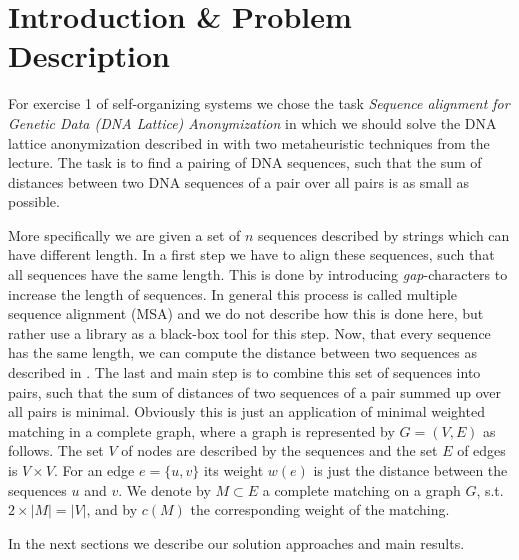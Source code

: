 \documentclass[12pt]{article}
\begin{document}
\maketitle

\section{Introduction \& Problem Description}
For exercise 1 of self-organizing systems we chose the task \textit{Sequence alignment for Genetic Data (DNA Lattice) Anonymization} in which we should solve the DNA lattice anonymization described in \cite{mainpaper} with two metaheuristic techniques from the lecture.
The task is to find a pairing of DNA sequences, such that the sum of distances between two DNA sequences of a pair over all pairs is as small as possible.

More specifically we are given a set of $n$ sequences described by strings which can have different length.
In a first step we have to align these sequences, such that all sequences have the same length.
This is done by introducing \textit{gap}-characters to increase the length of sequences.
In general this process is called multiple sequence alignment (MSA) and we do not describe how this is done here, but rather use a library as a black-box tool for this step.
Now, that every sequence has the same length, we can compute the distance between two sequences as described in \cite{mainpaper}.
The last and main step is to combine this set of sequences into pairs, such that the sum of distances of two sequences of a pair summed up over all pairs is minimal.
Obviously this is just an application of minimal weighted matching in a complete graph, where a graph is represented by $G=(V,E)$ as follows.
The set $V$ of nodes are described by the sequences and the set $E$ of edges is $V\times V$.
For an edge $e=\{u,v\}$ its weight $w(e)$ is just the distance between the sequences $u$ and $v$. 
We denote by $M \subset E$ a complete matching on a graph $G$, s.t. $2 \times |M| = |V|$, and by $c(M)$ the corresponding weight of the matching.

In the next sections we describe our solution approaches and main results.
\end{document}
